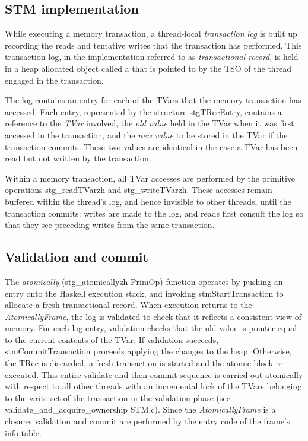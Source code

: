 \subsection{STM implementation}
While executing a memory transaction, a thread-local \emph{transaction log} is built up recording the reads and tentative writes that the transaction has performed. 
This transaction log, in the implementation referred to as \emph{transactional record}, is held in a heap allocated object called a  that is pointed to by the TSO of the thread engaged in the transaction.

The log contains an entry for each of the TVars that the memory transaction has accessed.
Each entry, represented by the structure stgTRecEntry, contains a reference to the \emph{TVar} involved, the \emph{old value} held in the TVar when it was first accessed in the transaction, and the \emph{new value} to be stored in the TVar if the transaction commits.
These two values are identical in the case a TVar has been read but not written by the transaction.

Within a memory transaction, all TVar accesses are performed by the primitive operations stg\_readTVarzh and stg\_writeTVarzh. These accesses remain buffered within the thread’s log, and hence invisible to other threads, until the transaction commits: writes are made to the log, and reads first consult the log so that they see preceding writes from the same transaction.

\subsection{Validation and commit}

The \emph{atomically} (stg\_atomicallyzh PrimOp) function operates by pushing an  entry onto the Haskell execution stack, and invoking stmStartTransaction to allocate a fresh transactional record.
When execution returns to the \emph{AtomicallyFrame}, the log is validated to check that it reflects a consistent view of memory.
For each log entry, validation checks that the old value is pointer-equal to the current contents of the TVar.
If validation succeeds, stmCommitTransaction proceeds applying the changes to the heap. Otherwise, the TRec is discarded, a fresh transaction is started and the atomic block re-executed.
This entire validate-and-then-commit sequence is carried out atomically with respect to all other threads with an incremental lock of the TVars belonging to the write set of the transaction in the validation phase (see validate\_and\_acquire\_ownership STM.c).
Since the \emph{AtomicallyFrame} is a closure, validation and commit are performed by the entry code of the frame's info table.

